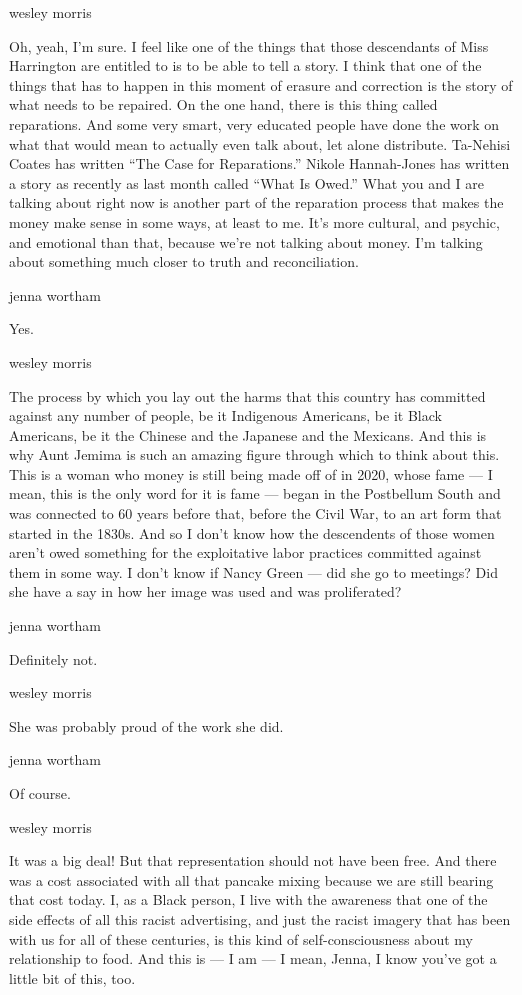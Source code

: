 wesley morris

Oh, yeah, I'm sure. I feel like one of the things that those descendants
of Miss Harrington are entitled to is to be able to tell a story. I
think that one of the things that has to happen in this moment of
erasure and correction is the story of what needs to be repaired. On the
one hand, there is this thing called reparations. And some very smart,
very educated people have done the work on what that would mean to
actually even talk about, let alone distribute. Ta-Nehisi Coates has
written ``The Case for Reparations.'' Nikole Hannah-Jones has written a
story as recently as last month called ``What Is Owed.'' What you and I
are talking about right now is another part of the reparation process
that makes the money make sense in some ways, at least to me. It's more
cultural, and psychic, and emotional than that, because we're not
talking about money. I'm talking about something much closer to truth
and reconciliation.

jenna wortham

Yes.

wesley morris

The process by which you lay out the harms that this country has
committed against any number of people, be it Indigenous Americans, be
it Black Americans, be it the Chinese and the Japanese and the Mexicans.
And this is why Aunt Jemima is such an amazing figure through which to
think about this. This is a woman who money is still being made off of
in 2020, whose fame --- I mean, this is the only word for it is fame ---
began in the Postbellum South and was connected to 60 years before that,
before the Civil War, to an art form that started in the 1830s. And so I
don't know how the descendents of those women aren't owed something for
the exploitative labor practices committed against them in some way. I
don't know if Nancy Green --- did she go to meetings? Did she have a say
in how her image was used and was proliferated?

jenna wortham

Definitely not.

wesley morris

She was probably proud of the work she did.

jenna wortham

Of course.

wesley morris

It was a big deal! But that representation should not have been free.
And there was a cost associated with all that pancake mixing because we
are still bearing that cost today. I, as a Black person, I live with the
awareness that one of the side effects of all this racist advertising,
and just the racist imagery that has been with us for all of these
centuries, is this kind of self-consciousness about my relationship to
food. And this is --- I am --- I mean, Jenna, I know you've got a little
bit of this, too.

